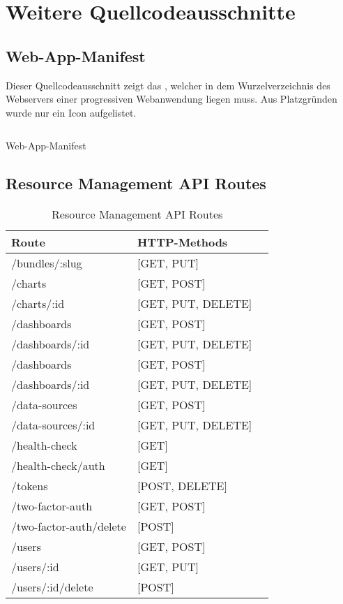 \chapter{Weitere Quellcodeausschnitte}
\label{chap:weiterequellcodeausschnitte}

\section*{Web-App-Manifest}
\label{sec:webappmanifest}
Dieser Quellcodeausschnitt zeigt das , welcher in dem Wurzelverzeichnis
des Webservers einer progressiven Webanwendung liegen muss. Aus Platzgründen wurde nur ein
Icon aufgelistet.
\begin{listing}[h]
    \inputminted{jsx}{snippets/json/manifest.json}
    \caption{Web-App-Manifest}
    \label{lst:webappmanifest}
\end{listing}

\newpage

\section*{Resource Management API Routes}
\label{sec:resourcemanagementapiroutes}

\begin{table}[h]
\begin{center}
\begin{tabular}{llc}
Route & HTTP-Methods \\
\hline
/bundles/:slug          &  [GET, PUT]         \\
/charts                 &  [GET, POST]        \\
/charts/:id             &  [GET, PUT, DELETE] \\
/dashboards             &  [GET, POST]        \\
/dashboards/:id         &  [GET, PUT, DELETE] \\
/dashboards             &  [GET, POST]        \\
/dashboards/:id         &  [GET, PUT, DELETE] \\
/data-sources           &  [GET, POST]        \\
/data-sources/:id       &  [GET, PUT, DELETE] \\
/health-check           &  [GET]              \\
/health-check/auth      &  [GET]              \\
/tokens                 &  [POST, DELETE]     \\
/two-factor-auth        &  [GET, POST]        \\
/two-factor-auth/delete &  [POST]             \\
/users                  &  [GET, POST]        \\
/users/:id              &  [GET, PUT]         \\
/users/:id/delete       &  [POST]             \\
\end{tabular}
\end{center}
\caption{Resource Management API Routes}
\label{tab:unterstutzterpwafunktionsumfangteil1}
\end{table}
